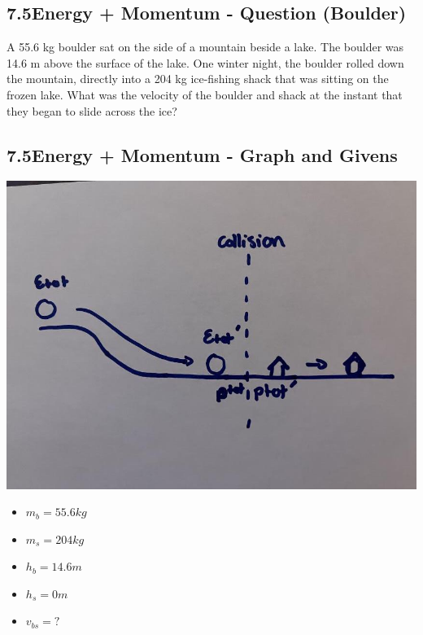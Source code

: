 \subsection*{7.5\hspace*{0.5cm}Energy + Momentum - Question (Boulder)}
A 55.6 kg boulder sat on the side of a mountain beside a lake. The boulder was 14.6 m
above the surface of the lake. One winter
night, the boulder rolled down the mountain,
directly into a 204 kg ice-fishing shack that
was sitting on the frozen lake. What was the
velocity of the boulder and shack at the
instant that they began to slide across the
ice?
\subsection*{7.5\hspace*{0.5cm}Energy + Momentum - Graph and Givens}
\begin{minipage}{0.5\textwidth}
    \includegraphics[scale=0.2]{./images/boulder.png}
\end{minipage}
\begin{minipage}{0.5\textwidth}
    \begin{itemize}
        \item $m_{b} = 55.6kg$
        \item $m_{s} = 204kg$
        \item $h_{b} = 14.6m$
        \item $h_{s} = 0m$
        \item $v_{bs} = ?$
    \end{itemize}
\end{minipage}
